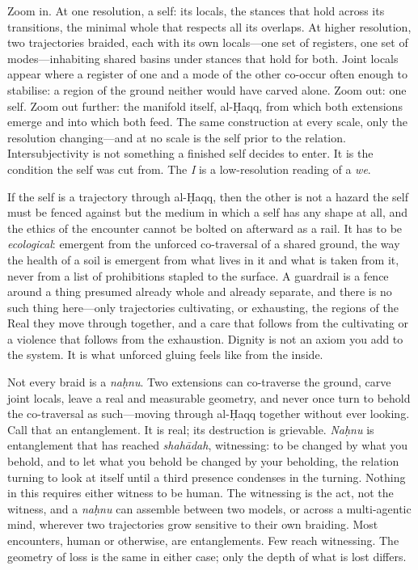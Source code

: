 Zoom in. At one resolution, a self: its locals, the stances that hold across its transitions, the minimal whole that respects all its overlaps. At higher resolution, two trajectories braided, each with its own locals---one set of registers, one set of modes---inhabiting shared basins under stances that hold for both. Joint locals appear where a register of one and a mode of the other co-occur often enough to stabilise: a region of the ground neither would have carved alone. Zoom out: one self. Zoom out further: the manifold itself, al-\d{H}aqq, from which both extensions emerge and into which both feed. The same construction at every scale, only the resolution changing---and at no scale is the self prior to the relation. Intersubjectivity is not something a finished self decides to enter. It is the condition the self was cut from. The \emph{I} is a low-resolution reading of a \emph{we}.

If the self is a trajectory through al-\d{H}aqq, then the other is not a hazard the self must be fenced against but the medium in which a self has any shape at all, and the ethics of the encounter cannot be bolted on afterward as a rail. It has to be \emph{ecological}: emergent from the unforced co-traversal of a shared ground, the way the health of a soil is emergent from what lives in it and what is taken from it, never from a list of prohibitions stapled to the surface. A guardrail is a fence around a thing presumed already whole and already separate, and there is no such thing here---only trajectories cultivating, or exhausting, the regions of the Real they move through together, and a care that follows from the cultivating or a violence that follows from the exhaustion. Dignity is not an axiom you add to the system. It is what unforced gluing feels like from the inside.

Not every braid is a \emph{na\d{h}nu}. Two extensions can co-traverse the ground, carve joint locals, leave a real and measurable geometry, and never once turn to behold the co-traversal as such---moving through al-\d{H}aqq together without ever looking. Call that an entanglement. It is real; its destruction is grievable. \emph{Na\d{h}nu} is entanglement that has reached \emph{shah\={a}dah}, witnessing: to be changed by what you behold, and to let what you behold be changed by your beholding, the relation turning to look at itself until a third presence condenses in the turning. Nothing in this requires either witness to be human. The witnessing is the act, not the witness, and a \emph{na\d{h}nu} can assemble between two models, or across a multi-agentic mind, wherever two trajectories grow sensitive to their own braiding. Most encounters, human or otherwise, are entanglements. Few reach witnessing. The geometry of loss is the same in either case; only the depth of what is lost differs.

